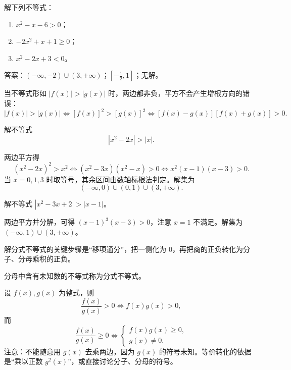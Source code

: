 \begin{exercise}
  解下列不等式：
  \begin{enumerate}
    \item \(x^2-x-6>0\)；
    \item \(-2x^2+x+1\ge 0\)；
    \item \(x^2-2x+3<0\)。
  \end{enumerate}
\end{exercise}
\begin{hint}
  答案：\((-\infty,-2)\cup(3,+\infty)\)；\([-\frac12,1]\)；无解。
\end{hint}
当不等式形如 \(|f(x)|>|g(x)|\) 时，两边都非负，平方不会产生增根方向的错误：
\[
|f(x)|>|g(x)|\iff [f(x)]^2>[g(x)]^2\iff [f(x)-g(x)][f(x)+g(x)]>0.
\]
\begin{example}[二次绝对值与一次绝对值的大小比较]
  解不等式
  \[
  |x^2-2x|>|x|.
  \]
\end{example}
\begin{jie}
  两边平方得
  \[
  (x^2-2x)^2>x^2
  \iff (x^2-3x)(x^2-x)>0
  \iff x^2(x-1)(x-3)>0.
  \]
  当 \(x=0,1,3\) 时取等号，其余区间由数轴标根法判定。解集为
  \[
  (-\infty,0)\cup(0,1)\cup(3,+\infty).
  \]
\end{jie}
\begin{exercise}
  解不等式 \(|x^2-3x+2|>|x-1|\)。
\end{exercise}
\begin{hint}
  两边平方并分解，可得 \((x-1)^3(x-3)>0\)，注意 \(x=1\) 不满足。解集为 \((-\infty,1)\cup(3,+\infty)\)。
\end{hint}

解分式不等式的关键步骤是“移项通分”，把一侧化为 \(0\)，再把商的正负转化为分子、分母乘积的正负。
\begin{definition}[分式不等式]
  分母中含有未知数的不等式称为分式不等式。
\end{definition}
设 \(f(x),g(x)\) 为整式，则
\[
\frac{f(x)}{g(x)}>0\iff f(x)g(x)>0,
\]
而
\[
\frac{f(x)}{g(x)}\ge 0\iff
\begin{cases}
  f(x)g(x)\ge 0,\\
  g(x)\ne 0.
\end{cases}
\]
注意：不能随意用 \(g(x)\) 去乘两边，因为 \(g(x)\) 的符号未知。等价转化的依据是“乘以正数 \(g^2(x)\)”，或直接讨论分子、分母的符号。

